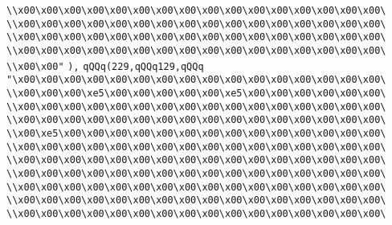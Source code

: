 \verb|\\x00\x00\x00\x00\x00\x00\x00\x00\x00\x00\x00\x00\x00\x00\x00\x00\|\newline
\verb|\\x00\x00\x00\x00\x00\x00\x00\x00\x00\x00\x00\x00\x00\x00\x00\x00\|\newline
\verb|\\x00\x00\x00\x00\x00\x00\x00\x00\x00\x00\x00\x00\x00\x00\x00\x00\|\newline
\verb|\\x00\x00\x00\x00\x00\x00\x00\x00\x00\x00\x00\x00\x00\x00\x00\x00\|\newline
\verb|\\x00\x00"|\newline
\verb|),|\newline
\verb|qQQq(229,qQQq129,qQQq|\newline
\verb|"\x00\x00\x00\x00\x00\x00\x00\x00\x00\x00\x00\x00\x00\x00\x00\x00\|\newline
\verb|\\x00\x00\x00\xe5\x00\x00\x00\x00\x00\xe5\x00\x00\x00\x00\x00\x00\|\newline
\verb|\\x00\x00\x00\x00\x00\x00\x00\x00\x00\x00\x00\x00\x00\x00\x00\x00\|\newline
\verb|\\x00\x00\x00\x00\x00\x00\x00\x00\x00\x00\x00\x00\x00\x00\x00\x00\|\newline
\verb|\\x00\xe5\x00\x00\x00\x00\x00\x00\x00\x00\x00\x00\x00\x00\x00\x00\|\newline
\verb|\\x00\x00\x00\x00\x00\x00\x00\x00\x00\x00\x00\x00\x00\x00\x00\x00\|\newline
\verb|\\x00\x00\x00\x00\x00\x00\x00\x00\x00\x00\x00\x00\x00\x00\x00\x00\|\newline
\verb|\\x00\x00\x00\x00\x00\x00\x00\x00\x00\x00\x00\x00\x00\x00\x00\x00\|\newline
\verb|\\x00\x00\x00\x00\x00\x00\x00\x00\x00\x00\x00\x00\x00\x00\x00\x00\|\newline
\verb|\\x00\x00\x00\x00\x00\x00\x00\x00\x00\x00\x00\x00\x00\x00\x00\x00\|\newline
\verb|\\x00\x00\x00\x00\x00\x00\x00\x00\x00\x00\x00\x00\x00\x00\x00\x00\|\newline
